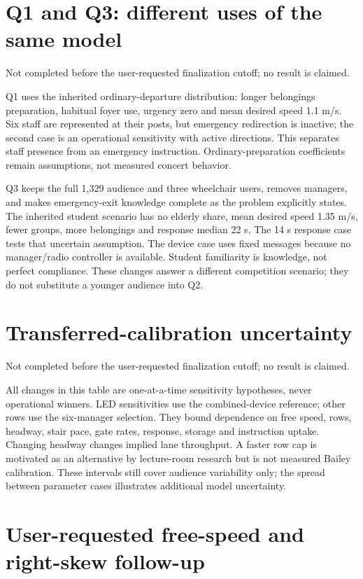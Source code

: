 \documentclass[11pt,a4paper]{article}
\begin{document}
\section{Q1 and Q3: different uses of the same model}

Not completed before the user-requested finalization cutoff; no result is claimed.


Q1 uses the inherited ordinary-departure distribution: longer belongings preparation, habitual foyer use, urgency zero and mean desired speed 1.1 m/s. Six staff are represented at their posts, but emergency redirection is inactive; the second case is an operational sensitivity with active directions. This separates staff presence from an emergency instruction. Ordinary-preparation coefficients remain assumptions, not measured concert behavior.


Q3 keeps the full 1,329 audience and three wheelchair users, removes managers, and makes emergency-exit knowledge complete as the problem explicitly states. The inherited student scenario has no elderly share, mean desired speed 1.35 m/s, fewer groups, more belongings and response median 22 s. The 14 s response case tests that uncertain assumption. The device case uses fixed messages because no manager/radio controller is available. Student familiarity is knowledge, not perfect compliance. These changes answer a different competition scenario; they do not substitute a younger audience into Q2.


\section{Transferred-calibration uncertainty}

Not completed before the user-requested finalization cutoff; no result is claimed.


All changes in this table are one-at-a-time sensitivity hypotheses, never operational winners. LED sensitivities use the combined-device reference; other rows use the six-manager selection. They bound dependence on free speed, rows, headway, stair pace, gate rates, response, storage and instruction uptake. Changing headway changes implied lane throughput. A faster row cap is motivated as an alternative by lecture-room research but is not measured Bailey calibration. These intervals still cover audience variability only; the spread between parameter cases illustrates additional model uncertainty.


\section{User-requested free-speed and right-skew follow-up}
\end{document}
